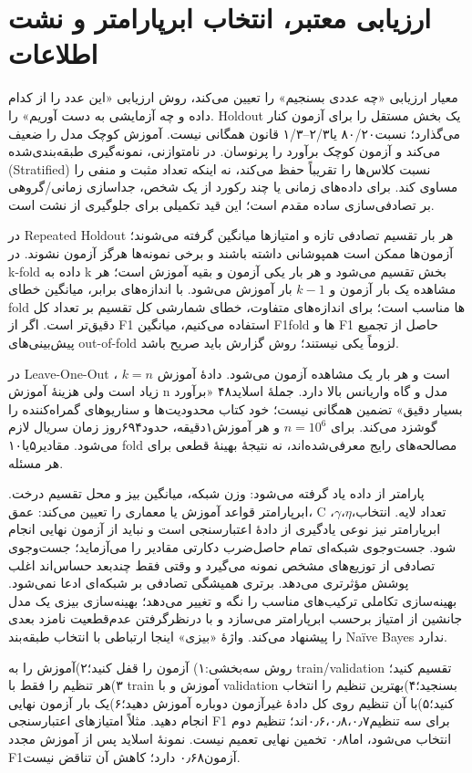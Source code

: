 \section{ارزیابی معتبر، انتخاب ابرپارامتر و نشت اطلاعات}

معیار ارزیابی «چه عددی بسنجیم» را تعیین می‌کند، روش ارزیابی «این عدد را از کدام داده و چه آزمایشی به دست آوریم» را. Holdout یک بخش مستقل را برای آزمون کنار می‌گذارد؛ نسبت۸۰/۲۰ یا۲/۳--۱/۳ قانون همگانی نیست. آموزش کوچک مدل را ضعیف می‌کند و آزمون کوچک برآورد را پرنوسان. در نامتوازنی، نمونه‌گیری طبقه‌بندی‌شده (Stratified) نسبت کلاس‌ها را تقریباً حفظ می‌کند، نه اینکه تعداد مثبت و منفی را مساوی کند. برای داده‌های زمانی یا چند رکورد از یک شخص، جداسازی زمانی/گروهی بر تصادفی‌سازی ساده مقدم است؛ این قید تکمیلی برای جلوگیری از نشت است.

در Repeated Holdout هر بار تقسیم تصادفی تازه و امتیازها میانگین گرفته می‌شوند؛ آزمون‌ها ممکن است همپوشانی داشته باشند و برخی نمونه‌ها هرگز آزمون نشوند. در k-fold داده به k بخش تقسیم می‌شود و هر بار یکی آزمون و بقیه آموزش است؛ هر مشاهده یک بار آزمون و $k-1$ بار آموزش می‌شود. با اندازه‌های برابر، میانگین خطای fold ها مناسب است؛ برای اندازه‌های متفاوت، خطای شمارشی کل تقسیم بر تعداد کل دقیق‌تر است. اگر از F1 استفاده می‌کنیم، میانگین F1fold ها و F1 حاصل از تجمیع پیش‌بینی‌های out-of-fold لزوماً یکی نیستند؛ روش گزارش باید صریح باشد.

در Leave-One-Out ، $k=n$ است و هر بار یک مشاهده آزمون می‌شود. دادهٔ آموزش زیاد است ولی هزینهٔ آموزش n مدل و گاه واریانس بالا دارد. جملهٔ اسلاید۴۸ «برآورد بسیار دقیق» تضمین همگانی نیست؛ خود کتاب محدودیت‌ها و سناریوهای گمراه‌کننده را گوشزد می‌کند. برای $n=10^6$ و هر آموزش۱دقیقه، حدود۶۹۴روز زمان سریال لازم می‌شود. مقادیر۵یا۱۰ fold مصالحه‌های رایج معرفی‌شده‌اند، نه نتیجهٔ بهینهٔ قطعی برای هر مسئله.

پارامتر از داده یاد گرفته می‌شود: وزن شبکه، میانگین بیز و محل تقسیم درخت. ابرپارامتر قواعد آموزش یا معماری را تعیین می‌کند: عمق، C ،$\gamma$،$\eta$،تعداد لایه. انتخاب ابرپارامتر نیز نوعی یادگیری از دادهٔ اعتبارسنجی است و نباید از آزمون نهایی انجام شود. جست‌وجوی شبکه‌ای تمام حاصل‌ضرب دکارتی مقادیر را می‌آزماید؛ جست‌وجوی تصادفی از توزیع‌های مشخص نمونه می‌گیرد و وقتی فقط چندبعد حساس‌اند اغلب پوشش مؤثرتری می‌دهد. برتری همیشگی تصادفی بر شبکه‌ای ادعا نمی‌شود. بهینه‌سازی تکاملی ترکیب‌های مناسب را نگه و تغییر می‌دهد؛ بهینه‌سازی بیزی یک مدل جانشین از امتیاز برحسب ابرپارامتر می‌سازد و با درنظرگرفتن عدم‌قطعیت نامزد بعدی را پیشنهاد می‌کند. واژهٔ «بیزی» اینجا ارتباطی با انتخاب طبقه‌بند Naïve Bayes ندارد.

روش سه‌بخشی:۱) آزمون را قفل کنید؛۲)آموزش را به train/validation تقسیم کنید؛۳)هر تنظیم را فقط با train آموزش و با validation بسنجید؛۴)بهترین تنظیم را انتخاب کنید؛۵)با آن تنظیم روی کل دادهٔ غیرآزمون دوباره آموزش دهید؛۶)یک بار آزمون نهایی انجام دهید. مثلاً امتیازهای اعتبارسنجی F1 برای سه تنظیم۰٫۶،۰٫۸،۰٫۷‌اند؛ تنظیم دوم انتخاب می‌شود، اما۰٫۸ تخمین نهایی تعمیم نیست. نمونهٔ اسلاید پس از آموزش مجدد F1آزمون۰٫۶۸ دارد؛ کاهش آن تناقض نیست.

